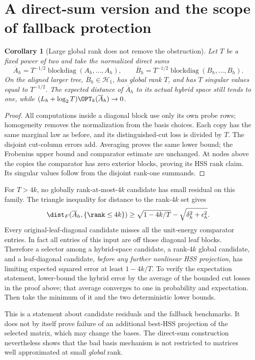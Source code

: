 \documentclass[11pt,oneside,openany,a4paper]{book}
\numberwithin{equation}{chapter}
\newtheorem{corollary}[theorem]{Corollary}
\theoremstyle{definition}
\theoremstyle{remark}
\DeclareMathOperator{\diag}{blockdiag}\DeclareMathOperator{\range}{range}
\newcommand{\HH}{\mathcal H}\newcommand{\SSS}{\mathcal S}
\begin{document}
\section{A direct-sum version and the scope of fallback protection}
\begin{corollary}[Large global rank does not remove the obstruction]\label{anchor:cor:directsum}
Let $T$ be a fixed power of two and take the normalized direct sums
\[
 \overline A_h=T^{-1/2}\diag(A_h,\ldots,A_h),\qquad
 \overline B_h=T^{-1/2}\diag(B_h,\ldots,B_h).
\]
On the aligned larger tree, $\overline B_h\in\HH_1$, has global rank $T$, and has $T$ singular values equal to $T^{-1/2}$. The expected distance of $\overline A_h$ to its actual hybrid space still tends to one, while $(L_h+\log_2T)\OPT_k(\overline A_h)\to0$.
\end{corollary}
\begin{proof}
All computations inside a diagonal block use only its own probe rows; homogeneity removes the normalization from the basis choices. Each copy has the same marginal law as before, and its distinguished-cut loss is divided by $T$. The disjoint cut-column errors add. Averaging proves the same lower bound; the Frobenius upper bound and comparator estimate are unchanged. At nodes above the copies the comparator has zero exterior blocks, proving its HSS rank claim. Its singular values follow from the disjoint rank-one summands.
\end{proof}

For $T>4k$, no globally rank-at-most-$4k$ candidate has small residual on this family. The triangle inequality for distance to the rank-$4k$ set gives
\begin{equation}\label{anchor:eq:globalfallback}
 \dist_F(\overline A_h,\{\rank\le4k\})
 \ge\sqrt{1-4k/T}-\sqrt{\delta_h^2+\epsilon_h^2}.
\end{equation}
Every original-leaf-diagonal candidate misses all the unit-energy comparator entries. In fact all entries of this input are off those diagonal leaf blocks. Therefore a selector among a hybrid-space candidate, a rank-$4k$ global candidate, and a leaf-diagonal candidate, \emph{before any further nonlinear HSS projection}, has limiting expected squared error at least $1-4k/T$. To verify the expectation statement, lower-bound the hybrid error by the average of the bounded cut losses in the proof above; that average converges to one in probability and expectation. Then take the minimum of it and the two deterministic lower bounds.

This is a statement about candidate residuals and the fallback benchmarks. It does not by itself prove failure of an additional best-HSS projection of the selected matrix, which may change the bases. The direct-sum construction nevertheless shows that the bad basis mechanism is not restricted to matrices well approximated at small \emph{global} rank.
\end{document}
